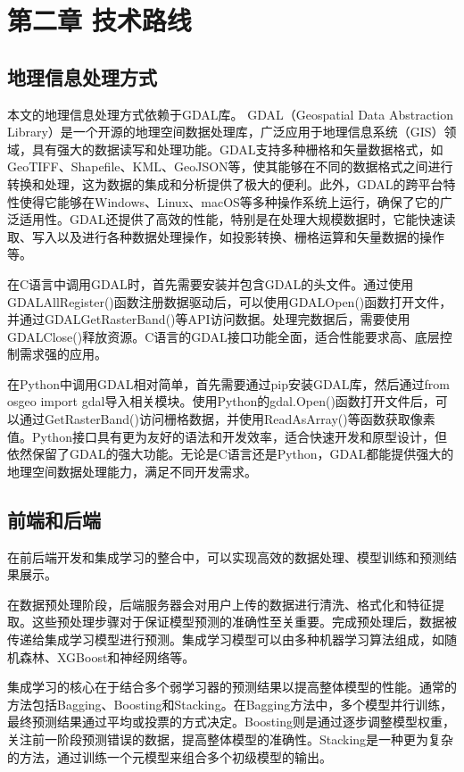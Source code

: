 \documentclass{article}
\begin{document}
		
	\section{第二章 技术路线}
	
	
	\subsection{地理信息处理方式}

	本文的地理信息处理方式依赖于GDAL库。
	GDAL（Geospatial Data Abstraction Library）是一个开源的地理空间数据处理库，广泛应用于地理信息系统（GIS）领域，具有强大的数据读写和处理功能。GDAL支持多种栅格和矢量数据格式，如GeoTIFF、Shapefile、KML、GeoJSON等，使其能够在不同的数据格式之间进行转换和处理，这为数据的集成和分析提供了极大的便利。此外，GDAL的跨平台特性使得它能够在Windows、Linux、macOS等多种操作系统上运行，确保了它的广泛适用性。GDAL还提供了高效的性能，特别是在处理大规模数据时，它能快速读取、写入以及进行各种数据处理操作，如投影转换、栅格运算和矢量数据的操作等。
	
	在C语言中调用GDAL时，首先需要安装并包含GDAL的头文件。通过使用GDALAllRegister()函数注册数据驱动后，可以使用GDALOpen()函数打开文件，并通过GDALGetRasterBand()等API访问数据。处理完数据后，需要使用GDALClose()释放资源。C语言的GDAL接口功能全面，适合性能要求高、底层控制需求强的应用。
	
	在Python中调用GDAL相对简单，首先需要通过pip安装GDAL库，然后通过from osgeo import gdal导入相关模块。使用Python的gdal.Open()函数打开文件后，可以通过GetRasterBand()访问栅格数据，并使用ReadAsArray()等函数获取像素值。Python接口具有更为友好的语法和开发效率，适合快速开发和原型设计，但依然保留了GDAL的强大功能。无论是C语言还是Python，GDAL都能提供强大的地理空间数据处理能力，满足不同开发需求。


	\subsection{前端和后端}
	在前后端开发和集成学习的整合中，可以实现高效的数据处理、模型训练和预测结果展示。
	
	在数据预处理阶段，后端服务器会对用户上传的数据进行清洗、格式化和特征提取。这些预处理步骤对于保证模型预测的准确性至关重要。完成预处理后，数据被传递给集成学习模型进行预测。集成学习模型可以由多种机器学习算法组成，如随机森林、XGBoost和神经网络等。
	
	集成学习的核心在于结合多个弱学习器的预测结果以提高整体模型的性能。通常的方法包括Bagging、Boosting和Stacking。在Bagging方法中，多个模型并行训练，最终预测结果通过平均或投票的方式决定。Boosting则是通过逐步调整模型权重，关注前一阶段预测错误的数据，提高整体模型的准确性。Stacking是一种更为复杂的方法，通过训练一个元模型来组合多个初级模型的输出。
	
\end{document}
